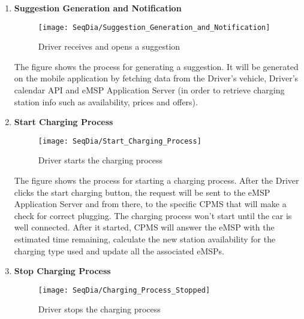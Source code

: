 \begin{enumerate}
        \newpage
        \item \textbf{Suggestion Generation and Notification}
        \begin{figure}[H]
            \begin{center}
            \texttt{[image: SeqDia/Suggestion\_Generation\_and\_Notification]}
            \caption{Driver receives and opens a suggestion}
            \label{fig:Suggestion}
            \end{center}
        \end{figure}
       The figure shows the process for generating a suggestion. It will be generated on the mobile application by fetching data from the Driver's vehicle, Driver's calendar API and eMSP Application Server (in order to retrieve charging station info such as availability, prices and offers). 
       \newpage
        \item \textbf{Start Charging Process}
        \begin{figure}[H]
            \begin{center}
            \texttt{[image: SeqDia/Start\_Charging\_Process]}
            \caption{Driver starts the charging process}
            \label{fig:StartCharge}
            \end{center}
        \end{figure}
        The figure shows the process for starting a charging process. After the Driver clicks the start charging button, the request will be sent to the eMSP Application Server and from there, to the specific CPMS that will make a check for correct plugging. The charging process won't start until the car is well connected. After it started, CPMS will answer the eMSP with the estimated time remaining, calculate the new station availability for the charging type used and update all the associated eMSPs. 
        \newpage
        \item \textbf{Stop Charging Process}
        \begin{figure}[H]
            \begin{center}
            \texttt{[image: SeqDia/Charging\_Process\_Stopped]}
            \caption{Driver stops the charging process}
            \label{fig:StopCharge}
            \end{center}

\end{figure}
\end{enumerate}
